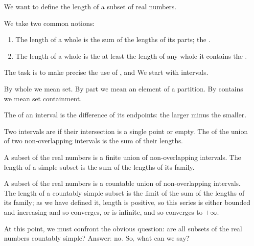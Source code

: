 \sbasic


\sstart



We want to define the length
of a subset of real numbers.


We take two common notions:

\begin{enumerate}

  \item
  The length of a whole
  is the sum of the lengths
  of its parts;
  the .

  \item
  The length of a whole
  is the at least the length
  of any whole it contains
  the .

\end{enumerate}

The task is to make precise
the use of
,
and 
We start with intervals.


By whole we mean set.
By part we mean an element
of a partition.
By contains we mean set
containment.

The
of an interval is the difference
of its endpoints: the larger minus
the smaller.

Two intervals are
if their intersection
is a single point or empty.
The  of the union of
two non-overlapping intervals is
the sum of their lengths.

A  subset
of the real numbers
is a finite union
of non-overlapping intervals.
The length of a simple subset
is the sum of the lengths of
its family.

A  subset
of the real numbers
is a countable union
of non-overlapping intervals.
The length of a countably simple subset
is the limit of the sum of the lengths
of its family; as we have defined it,
length is positive, so this series is either
bounded and increasing and so converges, or is
infinite, and so converges to $+\infty$.

At this point, we must confront the obvious
question: are all subsets of the real numbers
countably simple?
Answer: no.
So, what can we say?

